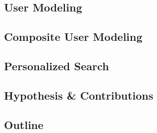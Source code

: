 \subsection{User Modeling}

\subsection{Composite User Modeling}

\subsection{Personalized Search}

\subsection{Hypothesis \& Contributions}

\subsection{Outline}
